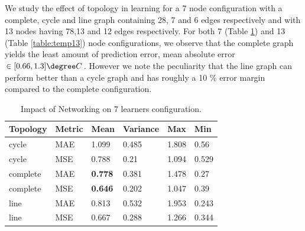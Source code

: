 We study the effect of topology in learning %
for a 7 node configuration with a complete, cycle and line graph containing 28, 7 and 6 edges respectively and with 13 nodes having 78,13 and 12 edges respectively. 
For both 7 (Table \ref{table:temp8}) and 13 (Table \ref{table:temp13}) node configurations, we observe that the complete graph yields the least amount of prediction error, mean absolute error $\in [0.66, 1.3] \degree C$. 
However we note the peculiarity that the line graph can perform better than a cycle graph and has roughly a 10 $\%$ error margin compared to the complete configuration.

\begin{table}[]
\begin{tabular}{|l|l|l|l|l|l|}
\hline
Topology & Metric    & Mean & Variance & Max   & Min \\ \hline
cycle    & MAE   & 1.099 & 0.485  & 1.808 &  0.56 \\ \hline
cycle    & MSE  &  0.788 & 0.21  & 1.094 &  0.529  \\ \hline
complete & MAE   & \textbf{0.778} & 0.381 & 1.478 & 0.27 \\ \hline
complete & MSE  & \textbf{0.646} & 0.202 & 1.047 & 0.39 \\ \hline
line     & MAE   & 0.813 & 0.532 & 1.953 & 0.243 \\ \hline
line     & MSE   & 0.667 & 0.288 & 1.266 & 0.344 \\ \hline
\end{tabular}
\caption{Impact of Networking on 7 learners configuration. }
\label{table:temp8}
\end{table}


